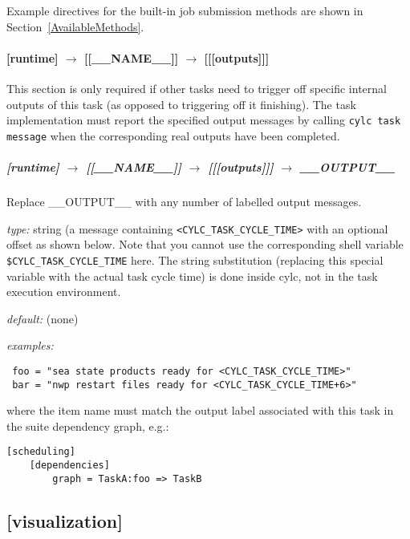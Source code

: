 Example directives for the built-in job submission methods are shown in
Section~\ref{AvailableMethods}.

\paragraph[{[[[}outputs{]]]}]{[runtime] $\rightarrow$ [[\_\_NAME\_\_]] $\rightarrow$ [[[outputs]]]}

This section is only required if other tasks need to trigger off specific
internal outputs of this task (as opposed to triggering off it finishing).
The task implementation must report the specified output messages 
by calling \lstinline=cylc task message= when the
corresponding real outputs have been completed.

\subparagraph[\_\_OUTPUT\_\_ ]{[runtime] $\rightarrow$ [[\_\_NAME\_\_]] $\rightarrow$ [[[outputs]]] $\rightarrow$ \_\_OUTPUT\_\_}

Replace \_\_OUTPUT\_\_ with any number of labelled output messages. 
\begin{myitemize}
    \item {\em type:} string (a message containing
        \lstinline=<CYLC_TASK_CYCLE_TIME>= with an optional offset as shown
        below. Note that you cannot use the corresponding shell variable
        \lstinline=$CYLC_TASK_CYCLE_TIME= here. The string substitution
        (replacing this special variable with the actual task cycle time) is
        done inside cylc, not in the task execution environment.
\item {\em default:} (none)
\item{ \em examples:}
 \begin{lstlisting}
 foo = "sea state products ready for <CYLC_TASK_CYCLE_TIME>"
 bar = "nwp restart files ready for <CYLC_TASK_CYCLE_TIME+6>"
 \end{lstlisting}
 where the item name must match the output label associated with
 this task in the suite dependency graph, e.g.:
\lstset{language=suiterc}
\begin{lstlisting}
[scheduling]
    [dependencies]
        graph = TaskA:foo => TaskB
 \end{lstlisting}
\end{myitemize}
\lstset{language=transcript}

\subsection{[visualization]}

